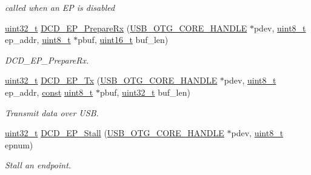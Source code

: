 \begin{DoxyCompactItemize}
\begin{DoxyCompactList}\small\item\em called when an E\-P is disabled \end{DoxyCompactList}\item 
\hyperlink{stdint_8h_a435d1572bf3f880d55459d9805097f62}{uint32\-\_\-t} \hyperlink{group___u_s_b___d_c_d___private___functions_gadb1ab76f48d6ea405e62c68af8ea6444}{D\-C\-D\-\_\-\-E\-P\-\_\-\-Prepare\-Rx} (\hyperlink{group___u_s_b___c_o_r_e___exported___types_gaf76054c11eb8a3367907aad7ae700e80}{U\-S\-B\-\_\-\-O\-T\-G\-\_\-\-C\-O\-R\-E\-\_\-\-H\-A\-N\-D\-L\-E} $\ast$pdev, \hyperlink{stdint_8h_aba7bc1797add20fe3efdf37ced1182c5}{uint8\-\_\-t} ep\-\_\-addr, \hyperlink{stdint_8h_aba7bc1797add20fe3efdf37ced1182c5}{uint8\-\_\-t} $\ast$pbuf, \hyperlink{stdint_8h_a273cf69d639a59973b6019625df33e30}{uint16\-\_\-t} buf\-\_\-len)
\begin{DoxyCompactList}\small\item\em D\-C\-D\-\_\-\-E\-P\-\_\-\-Prepare\-Rx. \end{DoxyCompactList}\item 
\hyperlink{stdint_8h_a435d1572bf3f880d55459d9805097f62}{uint32\-\_\-t} \hyperlink{group___u_s_b___d_c_d___private___functions_gad55cbc7c1e8666257b9a3918b80effa3}{D\-C\-D\-\_\-\-E\-P\-\_\-\-Tx} (\hyperlink{group___u_s_b___c_o_r_e___exported___types_gaf76054c11eb8a3367907aad7ae700e80}{U\-S\-B\-\_\-\-O\-T\-G\-\_\-\-C\-O\-R\-E\-\_\-\-H\-A\-N\-D\-L\-E} $\ast$pdev, \hyperlink{stdint_8h_aba7bc1797add20fe3efdf37ced1182c5}{uint8\-\_\-t} ep\-\_\-addr, \hyperlink{group___n_a_m_e_ga7ae6d0e43244213b34de2c2b9aa30da6}{const} \hyperlink{stdint_8h_aba7bc1797add20fe3efdf37ced1182c5}{uint8\-\_\-t} $\ast$pbuf, \hyperlink{stdint_8h_a435d1572bf3f880d55459d9805097f62}{uint32\-\_\-t} buf\-\_\-len)
\begin{DoxyCompactList}\small\item\em Transmit data over U\-S\-B. \end{DoxyCompactList}\item 
\hyperlink{stdint_8h_a435d1572bf3f880d55459d9805097f62}{uint32\-\_\-t} \hyperlink{group___u_s_b___d_c_d___private___functions_ga9c6f692cb2607db05b83073dc67bc429}{D\-C\-D\-\_\-\-E\-P\-\_\-\-Stall} (\hyperlink{group___u_s_b___c_o_r_e___exported___types_gaf76054c11eb8a3367907aad7ae700e80}{U\-S\-B\-\_\-\-O\-T\-G\-\_\-\-C\-O\-R\-E\-\_\-\-H\-A\-N\-D\-L\-E} $\ast$pdev, \hyperlink{stdint_8h_aba7bc1797add20fe3efdf37ced1182c5}{uint8\-\_\-t} epnum)
\begin{DoxyCompactList}\small\item\em Stall an endpoint. \end{DoxyCompactList}\item 

\end{DoxyCompactItemize}
